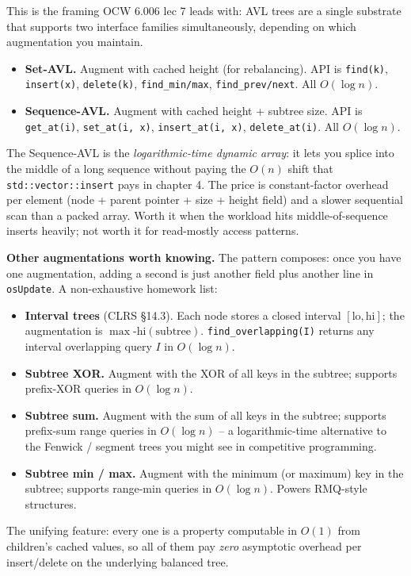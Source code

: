 \documentclass[11pt]{article}
\begin{document}
This is the framing OCW 6.006 lec 7 leads with: AVL trees are a
single substrate that supports two interface families
simultaneously, depending on which augmentation you maintain.
\begin{itemize}[leftmargin=*]
    \item \textbf{Set-AVL.} Augment with cached height (for
          rebalancing). API is \texttt{find(k)}, \texttt{insert(x)},
          \texttt{delete(k)}, \texttt{find\_min/max},
          \texttt{find\_prev/next}. All $O(\log n)$.
    \item \textbf{Sequence-AVL.} Augment with cached height +
          subtree size. API is \texttt{get\_at(i)},
          \texttt{set\_at(i, x)}, \texttt{insert\_at(i, x)},
          \texttt{delete\_at(i)}. All $O(\log n)$.
\end{itemize}
The Sequence-AVL is the \emph{logarithmic-time dynamic array}: it
lets you splice into the middle of a long sequence without paying
the $O(n)$ shift that \texttt{std::vector::insert} pays in
chapter 4. The price is constant-factor overhead per element
(node + parent pointer + size + height field) and a slower
sequential scan than a packed array. Worth it when the workload
hits middle-of-sequence inserts heavily; not worth it for
read-mostly access patterns.

\begin{notebox}
\textbf{Other augmentations worth knowing.} The pattern composes:
once you have one augmentation, adding a second is just another
field plus another line in \texttt{osUpdate}. A non-exhaustive
homework list:
\begin{itemize}[leftmargin=*]
    \item \textbf{Interval trees} (CLRS \S14.3). Each node stores
          a closed interval $[\text{lo}, \text{hi}]$; the
          augmentation is $\max\text{-hi}(\text{subtree})$.
          \texttt{find\_overlapping(I)} returns any interval
          overlapping query $I$ in $O(\log n)$.
    \item \textbf{Subtree XOR.} Augment with the XOR of all keys
          in the subtree; supports prefix-XOR queries in
          $O(\log n)$.
    \item \textbf{Subtree sum.} Augment with the sum of all keys
          in the subtree; supports prefix-sum range queries in
          $O(\log n)$ -- a logarithmic-time alternative to the
          Fenwick / segment trees you might see in competitive
          programming.
    \item \textbf{Subtree min / max.} Augment with the minimum (or
          maximum) key in the subtree; supports range-min queries
          in $O(\log n)$. Powers RMQ-style structures.
\end{itemize}
The unifying feature: every one is a property computable in
$O(1)$ from children's cached values, so all of them pay
\emph{zero} asymptotic overhead per insert/delete on the
underlying balanced tree.
\end{notebox}
\end{document}
